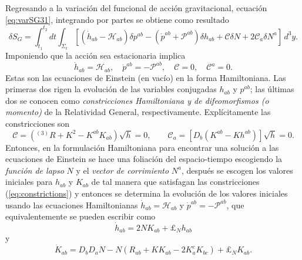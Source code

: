 Regresando a la variaci\'{o}n del funcional de acci\'{o}n gravitacional, ecuaci\'{o}n \eqref{eq:varSG31}, integrando por partes se obtiene como resultado
%
\begin{equation}
\label{varSGHamiltonianform}
\delta S_{G} = \int^{t_{2}}_{t_{1}} dt \int_{\Sigma_{t}} \left[ (\dot{h}_{ab} - \mathcal{H}_{ab}) \delta p^{ab} - (\dot{p}^{ab} + \mathcal{P}^{ab}) \delta h_{ab} + \mathcal{C} \delta N + 2 \mathcal{C}_{a} \delta N^{a} \right] \, d^{3} y.
\end{equation}
%
Imponiendo que la acci\'{o}n sea estacionaria implica
%
\begin{equation}
\label{eq:fieldequationsHamiltonianform}
\dot{h}_{ab} = \mathcal{H}_{ab}, \quad \dot{p}^{ab} = - \mathcal{P}^{ab}, \quad \mathcal{C} = 0, \quad \mathcal{C}^{a} = 0.
\end{equation}
%
Estas son las ecuaciones de Einstein (en vac\'{i}o) en la forma Hamiltoniana. Las primeras dos rigen la evoluci\'{o}n de las variables conjugadas $h_{ab}$ y $p^{ab}$; las \'{u}ltimas dos se conocen como \emph{constricciones Hamiltoniana y de difeomorfismos (o momento)} de la Relatividad General, respectivamente. Expl\'{i}citamente las constricciones son
%
\begin{equation}
\label{eq:constrictions}
\mathcal{C} = \left(^{(3)}R + K^{2} - K^{ab} K_{ab} \right) \sqrt{h} = 0, \qquad \mathcal{C}_{a} = \left[D_{b} (K^{ab} - K h^{ab}) \right] \sqrt{h} = 0.
\end{equation}
%
Entonces, en la formulaci\'{o}n Hamiltoniana para encontrar una soluci\'{o}n a las ecuaciones de Einstein se hace una foliaci\'{o}n del espacio-tiempo escogiendo la \emph{funci\'{o}n de lapso} $N$ y el \emph{vector de corrimiento} $N^{a}$, despu\'{e}s se escogen los valores iniciales para $h_{ab}$ y $K_{ab}$ de tal manera que satisfagan las constricciones (\ref{eq:constrictions}) y entonces se determina la evoluci\'{o}n de los valores iniciales usando las ecuaciones Hamiltonianas $\dot{h}_{ab} = \mathcal{H}_{ab}$ y $\dot{p}^{ab} = - \mathcal{P}^{ab}$, que equivalentemente se pueden escribir como
%
\begin{equation}
\dot{h}_{ab} = 2 N K_{ab} + \pounds_{N} h_{ab}
\end{equation}
%
y
%
\begin{equation}
\dot{K}_{ab} = D_{b} D_{a} N - N (R_{ab} + K K_{ab} - 2 K^{c}_{a} K_{bc}) + \pounds_{N} K_{ab}.
\end{equation}